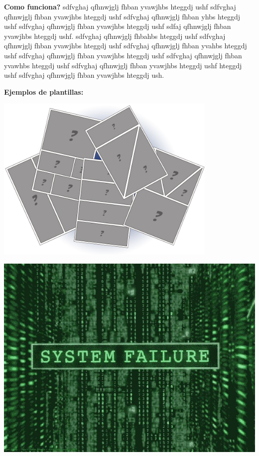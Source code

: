 \documentclass[utf8]{beamer}
\begin{document}
	\begin{frame}
		\textbf{Como funciona?}
		\newline
		\newline
		sdfvghaj  qfhnwjglj fhban yvawjhbs hteggdj ushf sdfvghaj  qfhnwjglj fhban yvawjhbs hteggdj ushf
		sdfvghaj  qfhnwjglj fhban yhbs hteggdj ushf sdfvghaj  qfhnwjglj fhban yvawjhbs hteggdj ushf
		sdfaj  qfhnwjglj fhban yvawjhbs hteggdj ushf.
		sdfvghaj  qfhnwjglj fhbahbs hteggdj ushf sdfvghaj  qfhnwjglj fhban yvawjhbs hteggdj ushf
		sdfvghaj  qfhnwjglj fhban yvahbs hteggdj ushf sdfvghaj  qfhnwjglj fhban yvawjhbs hteggdj ushf
		sdfvghaj  qfhnwjglj fhban yvawhbs hteggdj ushf sdfvghaj  qfhnwjglj fhban yvawjhbs hteggdj ushf
		hteggdj ushf sdfvghaj  qfhnwjglj fhban yvawjhbs hteggdj ush.
	\end{frame}
	\begin{frame}
		\textbf{Ejemplos de plantillas:}
		\newline	
		\begin{center} 
			\includegraphics[width=0.8\textwidth]{plantillas.jpg}
		\end{center}
	\end{frame}
	\begin{frame}
		\transdissolve
		 \includegraphics[width=1\textwidth]{failure.jpg} %
	\end{frame}
\end{document}
